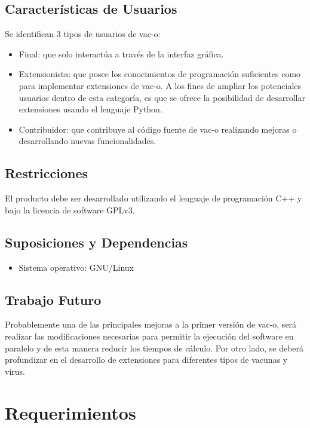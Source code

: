 \documentclass[10pt,a4paper]{article}
\begin{document}
  \subsection{Caracter\'isticas de Usuarios}
  Se identifican 3 tipos de usuarios de vac-o:
  \begin{itemize}
    \item Final: que solo interact\'ua a trav\'es de la interfaz gr\'afica.
    \item Extensionista: que posee los conocimientos de programaci\'on
suficientes como para implementar extensiones de vac-o. A los fines de ampliar
los potenciales usuarios dentro de esta categor\'ia, es que se ofrece la
posibilidad de desarrollar extensiones usando el lenguaje Python.
    \item Contribuidor: que contribuye al c\'odigo fuente de vac-o realizando
mejoras o desarrollando nuevas funcionalidades.
  \end{itemize}

  \subsection{Restricciones}
  El producto debe ser desarrollado utilizando el lenguaje de programaci\'on C++
y bajo la licencia de software GPLv3.
  
  \subsection{Suposiciones y Dependencias}
    \begin{itemize}
      \item Sistema operativo: GNU/Linux
    \end{itemize}
  
  \subsection{Trabajo Futuro}
  Probablemente una de las principales mejoras a la primer versi\'on de vac-o,
ser\'a realizar las modificaciones necesarias para permitir la ejecuci\'on del
software en paralelo y de esta manera reducir los tiempos de c\'alculo. 
  Por otro lado, se deber\'a profundizar en el desarrollo de extensiones para
diferentes tipos de vacunas y virus.
  

\section{Requerimientos}
  \label{section-req}  
\end{document}
